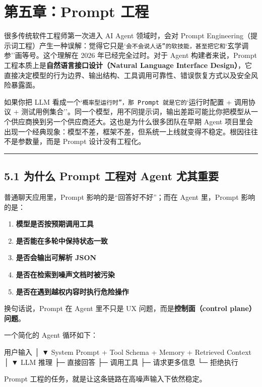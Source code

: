 \chapter{第五章：Prompt 工程}

很多传统软件工程师第一次进入 AI Agent 领域时，会对 Prompt Engineering（提示词工程）产生一种误解：觉得它只是`\texttt{会不会说人话''的软技能，甚至把它和}`玄学调参''画等号。这个理解在 2026 年已经完全过时。对于 Agent 构建者来说，Prompt 工程本质上是\textbf{自然语言接口设计（Natural Language Interface Design）}，它直接决定模型的行为边界、输出结构、工具调用可靠性、错误恢复方式以及安全风险暴露面。


如果你把 LLM 看成一个`\texttt{概率型运行时''，那 Prompt 就是它的}`运行时配置 + 调用协议 + 测试用例集合''。同一个模型，用不同提示词，输出差距可能比你把模型从一个供应商换到另一个供应商还大。这也是为什么很多团队在早期 Agent 项目里会出现一个经典现象：模型不差，框架不差，但系统一上线就变得不稳定。根因往往不是参数量，而是 Prompt 设计没有工程化。


\bigskip\hrule\bigskip

\section{5.1 为什么 Prompt 工程对 Agent 尤其重要}

普通聊天应用里，Prompt 影响的是``回答好不好''；而在 Agent 里，Prompt 影响的是：


\begin{enumerate}[leftmargin=2em]
\item \textbf{模型是否按预期调用工具}
\item \textbf{是否能在多轮中保持状态一致}
\item \textbf{是否会输出可解析 JSON}
\item \textbf{是否在检索到噪声文档时被污染}
\item \textbf{是否在遇到越权内容时执行危险操作}
\end{enumerate}

换句话说，Prompt 在 Agent 里不只是 UX 问题，而是\textbf{控制面（control plane）问题}。


一个简化的 Agent 循环如下：


\begin{codeblock}
用户输入
   │
   ▼
System Prompt + Tool Schema + Memory + Retrieved Context
   │
   ▼
LLM 推理
   ├─ 直接回答
   ├─ 调用工具
   ├─ 请求更多信息
   └─ 拒绝执行
\end{codeblock}

Prompt 工程的任务，就是让这条链路在高噪声输入下依然稳定。


